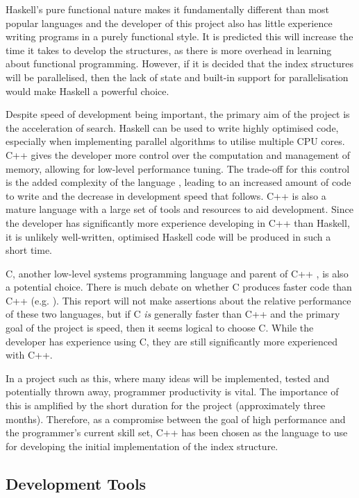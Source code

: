 Haskell's pure functional nature makes it fundamentally different than most popular languages and the developer of this project also has little experience writing programs in a purely functional style. It is predicted this will increase the time it takes to develop the structures, as there is more overhead in learning about functional programming. However, if it is decided that the index structures will be parallelised, then the lack of state and built-in support for parallelisation \cite{parallel-haskell} would make Haskell a powerful choice.

Despite speed of development being important, the primary aim of the project is the acceleration of search. Haskell can be used to write highly optimised code, especially when implementing parallel algorithms to utilise multiple CPU cores. C++ gives the developer more control over the computation and management of memory, allowing for low-level performance tuning. The trade-off for this control is the added complexity of the language \cite{cpp-hard}, leading to an increased amount of code to write and the decrease in development speed that follows. C++ is also a mature language with a large set of tools and resources to aid development. Since the developer has significantly more experience developing in C++ than Haskell, it is unlikely well-written, optimised Haskell code will be produced in such a short time. 

C, another low-level systems programming language \cite{c-lang} and parent of C++ \cite{cpp}, is also a potential choice. There is much debate on whether C produces faster code than C++ (e.g. \cite{c-vs-cpp1, c-vs-cpp2, c-vs-cpp3}). This report will not make assertions about the relative performance of these two languages, but if C \textit{is} generally faster than C++ and the primary goal of the project is speed, then it seems logical to choose C. While the developer has experience using C, they are still significantly more experienced with C++.

In a project such as this, where many ideas will be implemented, tested and potentially thrown away, programmer productivity is vital. The importance of this is amplified by the short duration for the project (approximately three months). Therefore, as a compromise between the goal of high performance and the programmer's current skill set, C++ has been chosen as the language to use for developing the initial implementation of the index structure. 

\subsection{Development Tools}
\label{sec:development-tools}

